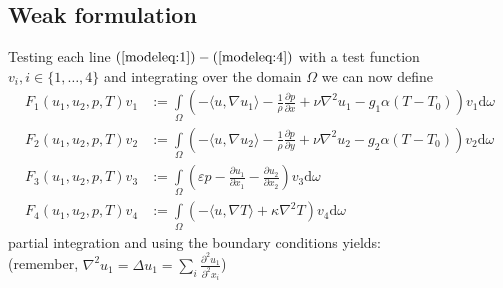 \documentclass{article}
\begin{document}
 \subsection{Weak formulation}
Testing each line  $(\ref{modeleq:1})-(\ref{modeleq:4})$ with a test function $v_i,i\in \{1,\dots,4\}$ and integrating over the domain $\Omega$ we can now define 
 \begin{align}
F_1(u_1,u_2,p,T)v_1 &:= \int\limits_\Omega \left(-\langle u,\nabla u_1\rangle -\frac{1}{\rho}\frac{\partial p}{\partial x} + \nu \nabla^2 u_1 - g_1\alpha (T-T_0)\right)v_1\text{d}\omega \label{F:1}\\
F_2(u_1,u_2,p,T)v_2 &:=\int\limits_\Omega \left(-\langle u,\nabla u_2\rangle  -\frac{1}{\rho}\frac{\partial p}{\partial y} + \nu \nabla^2 u_2 - g_2\alpha (T-T_0)\right)v_2\text{d}\omega \label{F:2}\\
F_3(u_1,u_2,p,T)v_3 &:= \int\limits_\Omega\left(\varepsilon p -  \frac{\partial u_1}{\partial x_1} - \frac{\partial u_2}{\partial x_2}\right)v_3\text{d}\omega\label{F:3}\\
F_4(u_1,u_2,p,T)v_4 &:=\int\limits_\Omega \left(-\langle u,\nabla T\rangle+ \kappa \nabla^2 T\right)v_4 \text{d}\omega\label{F:4}
 \end{align}
 partial integration and using the boundary conditions yields: \\(remember, $\nabla^2 u_1 = \Delta u_1 = \sum\limits_i \frac{\partial^2 u_1}{\partial^2 x_i}$)
\end{document}
